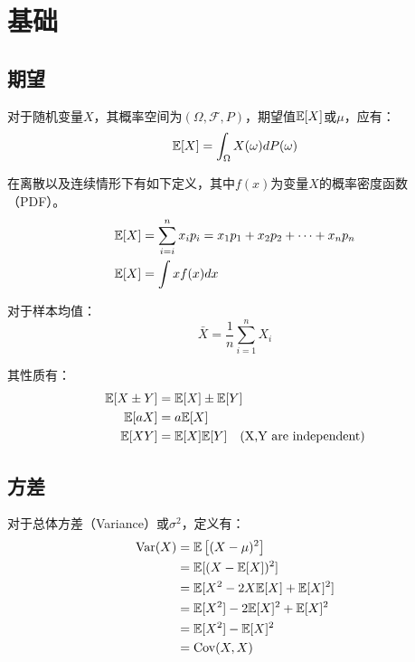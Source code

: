 \documentclass[11pt]{article}
\begin{document}
\maketitle
\tableofcontents

\section{基础}

\subsection{期望}

对于随机变量$X$，其概率空间为$(\Omega,\mathcal{F},P)$，期望值$\mathbb{E}[X]$或$\mu$，应有：
\begin{equation*}
    \mathbb{E}[X] = \int_{\Omega} X(\omega) dP(\omega)
\end{equation*}

在离散以及连续情形下有如下定义，其中$f(x)$为变量$X$的概率密度函数（PDF）。
\begin{align*}
    \mathbb{E}[X] &= \sum_{i=i}^n x_i p_i =x_1 p_1 + x_2 p_2 + \dots + x_n p_n \\
    \mathbb{E}[X] &= \int x f(x) dx
\end{align*}

对于样本均值：
\begin{equation*}
    \bar{X} = \frac{1}{n} \sum_{i=1}^{n} X_i
\end{equation*}

其性质有：
\begin{align*}
    \mathbb{E}[X \pm Y] &= \mathbb{E}[X] \pm \mathbb{E}[Y] \\
    \mathbb{E}[aX] &= a \mathbb{E}[X] \\
    \mathbb{E}[XY] &= \mathbb{E}[X]\mathbb{E}[Y] \quad \text{(X,Y are independent)}
\end{align*}

\subsection{方差}

对于总体方差（Variance）或$\sigma^2$，定义有：
\begin{align*}
    \operatorname{Var}(X) &= \mathbb{E}\left[ (X-\mu)^2 \right]\\
    &= \mathbb{E}[(X-\mathbb{E}[X])^2] \\
    &= \mathbb{E}[X^2 - 2X\mathbb{E}[X] + \mathbb{E}[X]^2] \\
    &= \mathbb{E}[X^2] - 2\mathbb{E}[X]^2 + \mathbb{E}[X]^2 \\
    &= \mathbb{E}[X^2] - \mathbb{E}[X]^2 \\
    &= \operatorname{Cov}(X,X)
\end{align*}
\end{document}
